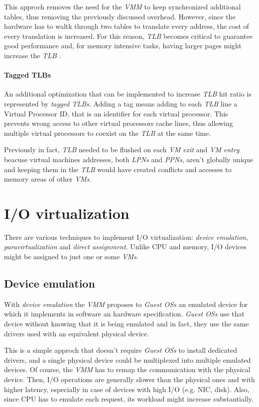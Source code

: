 \noindent
This approch removes the need for the \emph{VMM} to keep synchronized additional
tables, thus removing the previously discussed overhead. However, since the
hardware has to waltk through two tables to translate every address, the cost of
every translation is increased. For this reason, \emph{TLB} becomes critical to
guarantee good performance and, for memory intensive tasks, having larger pages
might increase the \emph{TLB} .

\paragraph{Tagged TLBs}
An additional optimization that can be implemented to increase \emph{TLB} hit
ratio is represented by \emph{tagged TLBs}. Adding a tag means adding to each
\emph{TLB} line a Virtual Processor ID, that is an identifier for each virtual
processor. This prevents wrong access to other virtual processors cache lines,
thus allowing multiple virtual processors to coexist on the \emph{TLB} at the
same time.

Previously in fact, \emph{TLB} needed to be flushed on each \emph{VM exit} and
\emph{VM entry} beacuse virtual machines addresses, both \emph{LPNs} and
\emph{PPNs}, aren't globally unique and keeping them in the \emph{TLB} would
have created conflicts and accesses to memory areas of other \emph{VMs}.

\section{I/O virtualization}
There are various techniques to implement I/O virtualization: \emph{device
emulation}, \emph{paravirtualization} and \emph{direct assignment}. Unlike CPU and
memory, I/O devices might be assigned to just one or some \emph{VMs}.

\subsection{Device emulation}
With \emph{device emulation} the \emph{VMM} proposes to \emph{Guest OSs} an
emulated device for which it implements in software an hardware specification.
\emph{Guest OSs} use that device without knowing that it is being emulated and
in fact, they use the same drivers used with an equivalent physical device.

This is a simple approch that doesn't require \emph{Guest OSs} to install
dedicated drivers, and a single physical device could be multiplexed into
multiple emulated devices. Of course, the \emph{VMM} has to remap the communication
with the physical device. Then, I/O operations are generally slower than the
physical ones and with higher latency, especially in case of devices with high
I/O (e.g. NIC, disk). Also, since CPU has to emulate each request, its workload
might increase substantially.

